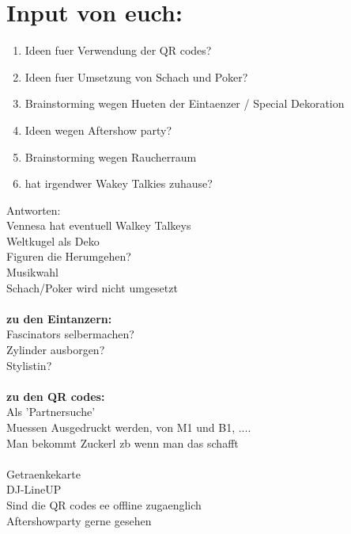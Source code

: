 \documentclass[12pt]{article}
\begin{document}
\section{Input von euch:}
\begin{enumerate}
\item Ideen fuer Verwendung der QR codes?
\item Ideen fuer Umsetzung von Schach und Poker?
\item Brainstorming wegen Hueten der Eintaenzer / Special Dekoration
\item Ideen wegen Aftershow party?
\item Brainstorming wegen Raucherraum
\item hat irgendwer Wakey Talkies zuhause?
\end{enumerate}
Antworten: \\
Vennesa hat eventuell Walkey Talkeys \\
Weltkugel als Deko \\
Figuren die Herumgehen? \\
Musikwahl \\
Schach/Poker wird nicht umgesetzt \\
\\\textbf{zu den Eintanzern:} \\
Fascinators selbermachen? \\
Zylinder ausborgen? \\
Stylistin? \\ \\
\textbf{zu den QR codes:} \\
Als 'Partnersuche' \\
Muessen Ausgedruckt werden, von M1 und B1, ....  \\
Man bekommt Zuckerl zb wenn man das schafft \\
\\ 
Getraenkekarte\\
DJ-LineUP \\
Sind die QR codes ee offline zugaenglich \\
Aftershowparty gerne gesehen
\newpage
\end{document}
